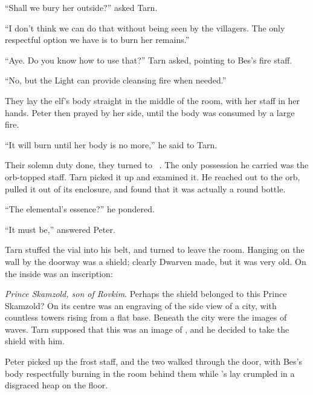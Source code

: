 ``Shall we bury her outside?'' asked Tarn.

``I don't think we can do that without being seen by the villagers.  The only respectful option we have is to burn her remains.''

``Aye.  Do you know how to use that?'' Tarn asked, pointing to Bes's fire staff.

``No, but the Light can provide cleansing fire when needed.''

They lay the elf's body straight in the middle of the room, with her staff in her hands.  Peter then prayed by her side, until the body was consumed by a large fire.

``It will burn until her body is no more,'' he said to Tarn.


Their solemn duty done, they turned to \mothzam\ \driktur.  The only possession he carried was the orb-topped staff.  Tarn picked it up and examined it.  He reached out to the orb, pulled it out of its enclosure, and found that it was actually a round bottle.

``The elemental's essence?'' he pondered.

``It must be,'' answered Peter.

Tarn stuffed the vial into his belt, and turned to leave the room.  Hanging on the wall by the doorway was a shield; clearly Dwarven made, but it was very old.  On the inside was an inscription:


\emph{Prince Skamzold, son of Rovkim}.  Perhaps the shield belonged to this Prince Skamzold? On its centre was an engraving of the side view of a city, with countless towers rising from a flat base.  Beneath the city were the images of waves.  Tarn supposed that this was an image of \valdunmir, and he decided to take the shield with him.

Peter picked up the frost staff, and the two walked through the door, with Bes's body respectfully burning in the room behind them while \mothzam's lay crumpled in a disgraced heap on the floor.
